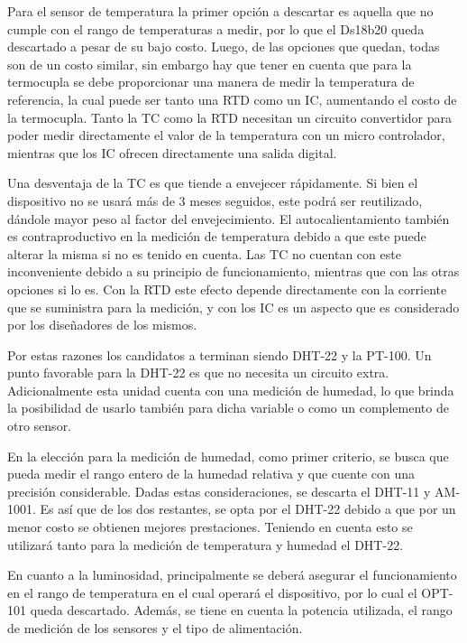 
Para el sensor de temperatura la primer opción a descartar es aquella que no cumple con el rango de temperaturas a medir, por lo que el Ds18b20 queda descartado a pesar de su bajo costo. Luego, de las opciones que quedan, todas son de un costo similar, sin embargo hay que tener en cuenta que para la termocupla se debe proporcionar una manera de medir la temperatura de referencia, la cual puede ser tanto una RTD como un IC, aumentando el costo de la termocupla. Tanto la TC como la RTD necesitan un circuito convertidor para poder medir directamente el valor de la temperatura con un micro controlador, mientras que los IC ofrecen directamente una salida digital.%

Una desventaja de la TC es que tiende a envejecer rápidamente. Si bien el dispositivo no se usará más de 3 meses seguidos, este podrá ser reutilizado, dándole mayor peso al factor del envejecimiento. El autocalientamiento también es contraproductivo en la medición de temperatura debido a que este puede alterar la misma si no es tenido en cuenta. Las TC no cuentan con este inconveniente debido a su principio de funcionamiento, mientras que con las otras opciones si lo es. Con la RTD este efecto depende directamente con la corriente que se suministra para la medición, y con los IC es un aspecto que es considerado por los diseñadores de los mismos.

Por estas razones los candidatos a terminan siendo DHT-22 y la PT-100. Un punto favorable para la DHT-22 es que no necesita un circuito extra. Adicionalmente esta unidad cuenta con una medición de humedad, lo que brinda la posibilidad de usarlo también para dicha variable o como un complemento de otro sensor.

En la elección para la medición de humedad, como primer criterio, se busca que pueda medir el rango entero de la humedad relativa y que cuente con una precisión considerable. Dadas estas consideraciones, se descarta el DHT-11 y AM-1001. Es así que de los dos restantes, se opta por el DHT-22 debido a que por un menor costo se obtienen mejores prestaciones. Teniendo en cuenta esto se utilizará tanto para la medición de temperatura y humedad el DHT-22.


En cuanto a la luminosidad, principalmente se deberá asegurar el funcionamiento en el rango de temperatura en el cual operará el dispositivo, por lo cual el OPT-101 queda descartado. Además, se tiene en cuenta la potencia utilizada, el rango de medición de los sensores y el tipo de alimentación.

